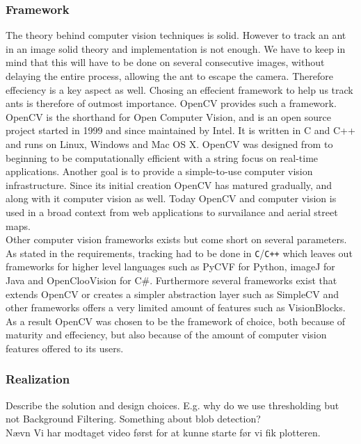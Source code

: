 \subsubsection{Framework}
\label{framework}
The theory behind computer vision techniques is solid. However to track an ant in an image solid theory and implementation is not enough. We have to keep in mind that this will have to be done on several consecutive images, without delaying the entire process, allowing the ant to escape the camera. Therefore effeciency is a key aspect as well. Chosing an effecient framework to help us track ants is therefore of outmost importance. OpenCV provides such a framework.\\

OpenCV is the shorthand for Open Computer Vision, and is an open source project started in 1999 and since maintained by Intel. It is written in C and C++ and runs on Linux, Windows and Mac OS X. OpenCV was designed from to beginning to be computationally efficient with a string focus on real-time applications. Another goal is to provide a simple-to-use computer vision infrastructure. Since its initial creation OpenCV has matured gradually, and along with it computer vision as well. Today OpenCV and computer vision is used in a broad context from web applications to survailance and aerial street maps.\\

Other computer vision frameworks exists but come short on several parameters. As stated in the requirements, tracking had to be done in \texttt{C}/\texttt{C++} which leaves out frameworks for higher level languages such as PyCVF for Python, imageJ for Java and OpenClooVision for C\#. Furthermore several frameworks exist that extends OpenCV or creates a simpler abstraction layer such as SimpleCV and other frameworks offers a very limited amount of features such as VisionBlocks. As a result OpenCV was chosen to be the framework of choice, both because of maturity and effeciency, but also because of the amount of computer vision features offered to its users.

\subsubsection{Realization}
Describe the solution and design choices. E.g. why do we use thresholding but not Background Filtering. Something about blob detection?\\
Nævn Vi har modtaget video først for at kunne starte før vi fik plotteren. \\


